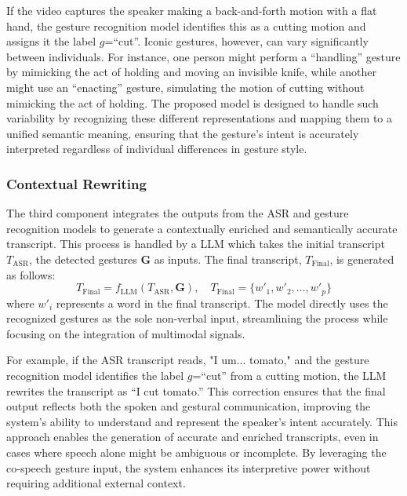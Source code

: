If the video captures the speaker making a back-and-forth motion with a flat hand, the gesture recognition model identifies this as a cutting motion and assigns it the label $g$=``cut''. Iconic gestures, however, can vary significantly between individuals. For instance, one person might perform a ``handling'' gesture by mimicking the act of holding and moving an invisible knife, while another might use an ``enacting'' gesture, simulating the motion of cutting without mimicking the act of holding. The proposed model is designed to handle such variability by recognizing these different representations and mapping them to a unified semantic meaning, ensuring that the gesture's intent is accurately interpreted regardless of individual differences in gesture style.

\subsubsection{Contextual Rewriting}
The third component integrates the outputs from the ASR and gesture recognition models to generate a contextually enriched and semantically accurate transcript. This process is handled by a LLM which takes the initial transcript $T_{\text{ASR}}$, the detected gestures $\mathbf{G}$ as inputs. The final transcript, $T_{\text{Final}}$, is generated as follows:
\begin{equation}
T_{\text{Final}} = f_{\text{LLM}}(T_{\text{ASR}}, \mathbf{G}), \quad T_{\text{Final}} = \{ w'_1, w'_2, \ldots, w'_p \}
\end{equation}
where $w'_i$ represents a word in the final transcript. The model directly uses the recognized gestures as the sole non-verbal input, streamlining the process while focusing on the integration of multimodal signals.

For example, if the ASR transcript reads, "I um... tomato," and the gesture recognition model identifies the label $g$=``cut''
from a cutting motion, the LLM rewrites the transcript as ``I cut tomato.'' This correction ensures that the final output reflects both the spoken and gestural communication, improving the system's ability to understand and represent the speaker's intent accurately.
This approach enables the generation of accurate and enriched transcripts, even in cases where speech alone might be ambiguous or incomplete. By leveraging the co-speech gesture input, the system enhances its interpretive power without requiring additional external context.